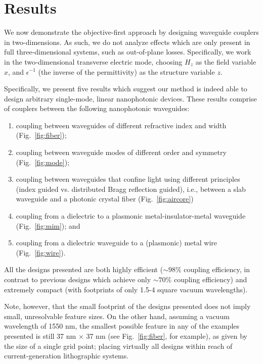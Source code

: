 \section{Results}
We now demonstrate the objective-first approach
    by designing waveguide couplers in two-dimensions.
As such, we do not analyze effects which are only present in full 
    three-dimensional systems, such as out-of-plane losses.
Specifically, we work in the two-dimensional transverse electric mode,
    choosing $H_z$ as the field variable $x$,
    and $\epsilon^{-1}$ (the inverse of the permittivity) 
    as the structure variable $z$.

Specifically, we present five results which suggest our method
    is indeed able to design arbitrary single-mode, linear nanophotonic devices\cite{Lu12}.
These results comprise of couplers between 
    the following nanophotonic waveguides:
    \begin{enumerate}
    \item coupling between waveguides of different refractive index and width
        (Fig.~\ref{fig:fiber});
    \item coupling between waveguide modes of different order and symmetry
        (Fig.~\ref{fig:mode});
    \item coupling between waveguides that confine light 
        using different principles 
        (index guided vs. distributed Bragg reflection guided), 
        i.e., between a slab waveguide and a photonic crystal fiber
        (Fig.~\ref{fig:aircore})
    \item coupling from a dielectric to a plasmonic metal-insulator-metal 
        waveguide (Fig.~\ref{fig:mim}); and
    \item coupling from a dielectric waveguide to a (plasmonic) metal wire
        (Fig.~\ref{fig:wire}).
    \end{enumerate}
All the designs presented are both highly efficient 
    ($\sim 98\%$ coupling efficiency, in contrast to previous designs
    which achieve only $\sim 70\%$ coupling efficiency\cite{Veronis07,Yang10})
    and extremely compact 
    (with footprints of only 1.5-4 square vacuum wavelengths).

Note, however, that the small footprint of the designs presented does not 
    imply small, unresolvable feature sizes.
On the other hand, assuming a vacuum wavelength of 1550 nm,
    the smallest possible feature in any of the examples presented is still
    37 nm $\times$ 37 nm (see Fig.~\ref{fig:fiber}, for example),
    as given by the size of a single grid point;
    placing virtually all designs within reach of current-generation lithographic
    systems.

